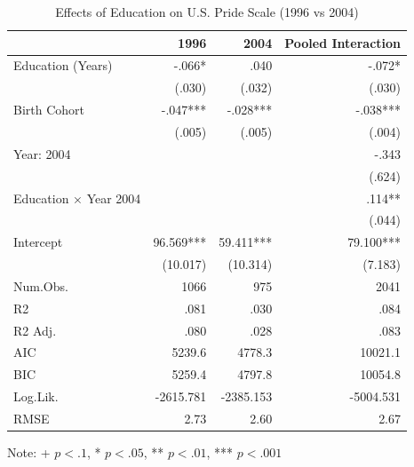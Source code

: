 \begin{table}[htbp]
\centering
\begin{threeparttable}
\caption{Effects of Education on U.S. Pride Scale (1996 vs 2004)}
\label{tab:educ}
\small
\begin{tabular}{lrrr}
\toprule
& 1996 & 2004 & Pooled Interaction \\
\midrule
Education (Years) & -.066* & .040 & -.072* \\
& (.030) & (.032) & (.030) \\
Birth Cohort & -.047*** & -.028*** & -.038*** \\
& (.005) & (.005) & (.004) \\
Year: 2004 &  &  & -.343 \\
&  &  & (.624) \\
Education × Year 2004 &  &  & .114** \\
&  &  & (.044) \\
Intercept & 96.569*** & 59.411*** & 79.100*** \\
& (10.017) & (10.314) & (7.183) \\
Num.Obs. & 1066 & 975 & 2041 \\
R2 & .081 & .030 & .084 \\
R2 Adj. & .080 & .028 & .083 \\
AIC & 5239.6 & 4778.3 & 10021.1 \\
BIC & 5259.4 & 4797.8 & 10054.8 \\
Log.Lik. & -2615.781 & -2385.153 & -5004.531 \\
RMSE & 2.73 & 2.60 & 2.67 \\
\bottomrule
\end{tabular}
\begin{tablenotes}
\small
\item Note: + $p < .1$, * $p < .05$, ** $p < .01$, *** $p < .001$
\end{tablenotes}
\end{threeparttable}
\end{table}
